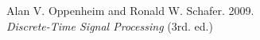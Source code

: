 \documentclass[preview]{standalone}
\begin{document}
\begin{center}
\raggedright Alan V. Oppenheim and Ronald W. Schafer. 2009.\\ \textit{Discrete-Time Signal Processing} (3rd. ed.)
\end{center}
\end{document}
